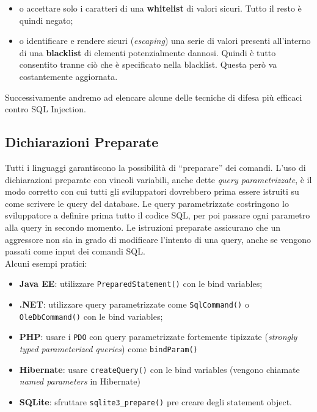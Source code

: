 \begin{itemize}
    \item o accettare solo i caratteri di una \textbf{whitelist} di valori sicuri.
          Tutto il resto è quindi negato;
    \item o identificare e rendere sicuri (\textit{escaping}) una serie di valori
          presenti all'interno di una \textbf{blacklist} di elementi
          potenzialmente dannosi. Quindi è
          tutto consentito tranne ciò che è specificato nella blacklist.
          Questa però va
          costantemente aggiornata.
\end{itemize}

Successivamente andremo ad elencare alcune delle tecniche di difesa più efficaci
contro SQL Injection.

\subsection{Dichiarazioni Preparate}

Tutti i linguaggi garantiscono la possibilità di “preparare” dei comandi.
L'uso di dichiarazioni preparate con vincoli variabili, anche dette
\textit{query parametrizzate}, è il
modo corretto con cui tutti gli sviluppatori dovrebbero prima essere istruiti su
come scrivere
le query del database.
Le query parametrizzate costringono lo sviluppatore a definire prima tutto il
codice SQL, per
poi passare ogni parametro alla query in secondo momento.
Le istruzioni preparate assicurano che un aggressore non sia in grado di
modificare l'intento
di una query, anche se vengono passati come input dei comandi SQL.\\

Alcuni esempi pratici:

\begin{itemize}
    \item \textbf{Java EE}:
          utilizzare  \verb|PreparedStatement()| con le bind variables;
    \item \textbf{.NET}:
          utilizzare query parametrizzate come \verb|SqlCommand()| o \verb|OleDbCommand()|
          con le bind variables;
    \item \textbf{PHP}: usare i \verb|PDO| con query parametrizzate fortemente tipizzate
          (\textit{strongly typed parameterized queries}) come \verb|bindParam()|
    \item \textbf{Hibernate}: usare \verb|createQuery()|
          con le bind variables (vengono chiamate \textit{named parameters}
          in Hibernate)
    \item \textbf{SQLite}: sfruttare \verb|sqlite3_prepare()|
          pre creare degli statement object.
\end{itemize}

